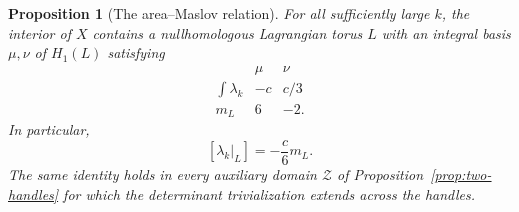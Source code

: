\documentclass[11pt]{amsart}
\newtheorem{proposition}[theorem]{Proposition}
\theoremstyle{definition}
\theoremstyle{remark}
\begin{document}
\begin{proposition}[The area--Maslov relation]\label{prop:negative-torus}
For all sufficiently large $k$, the interior of $X$ contains a
nullhomologous Lagrangian torus $L$ with an integral basis
$\mu,\nu$ of $H_1(L)$ satisfying
\begin{equation}\label{eq:torus-periods}
\begin{array}{c|rr}
 &\mu&\nu\\ \hline
 \displaystyle\int\lambda_k&-c&c/3\\
 m_L&6&-2.
\end{array}
\end{equation}
In particular,
\begin{equation}\label{eq:negative-maslov}
                  [\lambda_k|_L]=-\frac{c}{6}m_L.
\end{equation}
The same identity holds in every auxiliary domain $\mathcal Z$
of Proposition~\ref{prop:two-handles} for which the determinant
trivialization extends across the handles.
\end{proposition}
\end{document}
